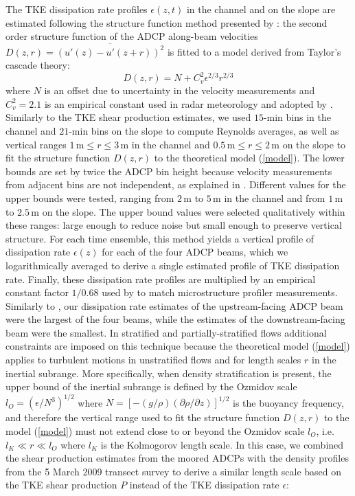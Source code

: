\label{subsectionEpsilon}
The TKE dissipation rate profiles $\epsilon(z,t)$ in the channel and on the slope are estimated following the structure function method presented by \textcite{Wiles:2006p5323}: the second order structure function of the ADCP along-beam velocities $D(z,r) = \overline{(u'(z) - u'(z+r))^2}$ is fitted to a model derived from Taylor's cascade theory:
 \begin{equation}
 D(z,r) = N + C_{v}^2 \epsilon^{2/3}r^{2/3}
 \label{model}
 \end{equation} 
where $N$ is an offset due to uncertainty in the velocity measurements and $C_{v}^2= 2.1$ is an empirical constant used in radar meteorology and adopted by \textcite{Wiles:2006p5323}. Similarly to the TKE shear production estimates, we used $15$-min bins in the channel and $21$-min bins on the slope to compute Reynolds averages, as well as vertical ranges $1 \, \mathrm{m} \leq r \leq 3 \, \mathrm{m}$ in the channel and $0.5 \, \mathrm{m} \leq r \leq 2 \, \mathrm{m}$ on the slope to fit the structure function $D(z,r)$ to the theoretical model (\ref{model}). The lower bounds are set by twice the ADCP bin height because velocity measurements from adjacent bins are not independent, as explained in \cite{Wiles:2006p5323}. Different values for the upper bounds were tested, ranging from $2\,\mathrm{m}$ to $5\,\mathrm{m}$ in the channel and from $1\,\mathrm{m}$ to $2.5\,\mathrm{m}$ on the slope. The upper bound values were selected qualitatively within these ranges: large enough to reduce noise but small enough to preserve vertical structure. For each time ensemble, this method yields a vertical profile of dissipation rate $\epsilon(z)$ for each of the four ADCP beams, which we logarithmically averaged to derive a single estimated profile of TKE dissipation rate. Finally, these dissipation rate profiles are multiplied by an empirical constant factor $1/0.68$ used by \textcite{Wiles:2006p5323} to match microstructure profiler measurements. Similarly to \textcite{Wiles:2006p5323}, our dissipation rate estimates of the upstream-facing ADCP beam were the largest of the four beams, while the estimates of the downstream-facing beam were the smallest. In stratified and partially-stratified flows additional constraints are imposed on this technique because the theoretical model (\ref{model}) applies to turbulent motions in unstratified flows and for length scales $r$ in the inertial subrange. More specifically, when density stratification is present, the upper bound of the inertial subrange is defined by the Ozmidov scale $l_O = (\epsilon / N^3)^{1/2}$ where $N=\left[-(g / \rho)(\partial \rho / \partial z)\right]^{1/2}$ is the buoyancy frequency, and therefore the vertical range used to fit the structure function $D(z,r)$ to the model (\ref{model}) must not extend close to or beyond the Ozmidov scale $l_O$, i.e. $l_K \ll r \ll l_O$ where $l_K$ is the Kolmogorov length scale. In this case, we combined the shear production estimates from the moored ADCPs with the density profiles from the 5 March 2009 transect survey to derive a similar length scale based on the TKE shear production $P$ instead of the TKE dissipation rate $\epsilon$:
